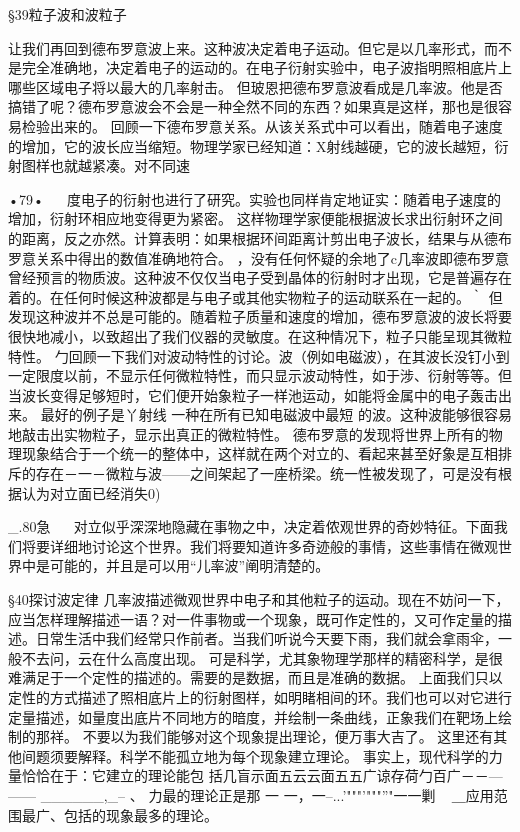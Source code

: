 §39粒子波和波粒子

让我们再回到德布罗意波上来。这种波决定着电子运动。但它是以几率形式，而不是完全准确地，决定着电子的运动的。在电子衍射实验中，电子波指明照相底片上哪些区域电子将以最大的几率射击。
但玻恩把德布罗意波看成是几率波。他是否搞错了呢？德布罗意波会不会是一种全然不同的东西？如果真是这样，那也是很容易检验出来的。
回顾一下德布罗意关系。从该关系式中可以看出，随着电子速度的增加，它的波长应当缩短。物理学家已经知道：X射线越硬，它的波长越短，衍射图样也就越紧凑。对不同速

•79•
  
度电子的衍射也进行了研究。实验也同样肯定地证实：随着电子速度的增加，衍射环相应地变得更为紧密。
这样物理学家便能根据波长求出衍射环之间的距离，反之亦然。计算表明：如果根据环间距离计剪出电子波长，结果与从德布罗意关系中得出的数值准确地符合。
，没有任何怀疑的余地了c几率波即德布罗意曾经预言的物质波。这种波不仅仅当电子受到晶体的衍射时才出现，它是普遍存在着的。在任何时候这种波都是与电子或其他实物粒子的运动联系在一起的。｀
但发现这种波并不总是可能的。随着粒子质量和速度的增加，德布罗意波的波长将要很快地减小，以致超出了我们仪器的灵敏度。在这种情况下，粒子只能呈现其微粒特性。
勹回顾一下我们对波动特性的讨论。波（例如电磁波），在其波长没钉小到一定限度以前，不显示任何微粒特性，而只显示波动特性，如于涉、衍射等等。但当波长变得足够短时，它们便开始象粒子一样池运动，如能将金属中的电子轰击出来。
	最好的例子是丫射线	一种在所有已知电磁波中最短
的波。这种波能够很容易地敲击出实物粒子，显示出真正的微粒特性。
德布罗意的发现将世界上所有的物理现象结合于一个统一的整体中，这样就在两个对立的、看起来甚至好象是互相排斥的存在－一－微粒与波——之间架起了一座桥梁。统一性被发现了，可是没有根据认为对立面已经消失0)

_.80急
  
对立似乎深深地隐藏在事物之中，决定着侬观世界的奇妙特征。下面我们将要详细地讨论这个世界。我们将要知道许多奇迹般的事情，这些事情在微观世界中是可能的，并且是可以用“儿率波”阐明清楚的。

§40探讨波定律
几率波描述微观世界中电子和其他粒子的运动。现在不妨问一下，应当怎样理解描述一语？对一件事物或一个现象，既可作定性的，又可作定量的描述。日常生活中我们经常只作前者。当我们听说今天要下雨，我们就会拿雨伞，一般不去问，云在什么高度出现。
可是科学，尤其象物理学那样的精密科学，是很难满足于一个定性的描述的。需要的是数据，而且是准确的数据。
上面我们只以定性的方式描述了照相底片上的衍射图样，如明睹相间的环。我们也可以对它进行定量描述，如量度出底片不同地方的暗度，并绘制一条曲线，正象我们在靶场上绘制的那祥。
不要以为我们能够对这个现象提出理论，便万事大吉了。
这里还有其他间题须要解释。科学不能孤立地为每个现象建立理论。
事实上，现代科学的力量恰恰在于：它建立的理论能包
	括几盲示面五云云面五五广谅存荷勹百广－－—	—---
______,_--
	、	力最的理论正是那
	一	一，一--...'"""'"""''"一一剿	~
＿应用范围最广、包括的现象最多的理论。


